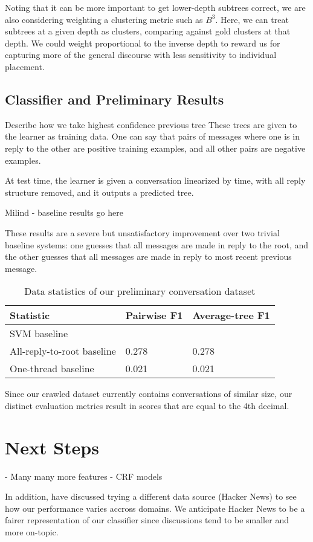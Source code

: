 \documentclass[10pt]{article}
\begin{document}
Noting that it can be more important to get lower-depth subtrees correct, we
are also considering weighting a clustering metric such as $B^3$. Here, we can
treat subtrees at a given depth as clusters, comparing against gold clusters at
that depth. We could weight proportional to the inverse depth to reward us for
capturing more of the general discourse with less sensitivity to individual placement.

\subsection{Classifier and Preliminary Results}
\label{sec:classifier}
{Describe how we take highest confidence previous tree}
These trees are given to the learner as training data. One can say that
pairs of messages where one is in reply to the other are positive training
examples, and all other pairs are negative examples.

At test time, the learner is given a conversation linearized by time, with all
reply structure removed, and it outputs a predicted tree.

{Milind - baseline results go here}

These results are a severe but unsatisfactory improvement over two trivial baseline
systems: one guesses that all messages are made in reply to the root, and the
other guesses that all messages are made in reply to most recent previous message.

\begin{table}[h]\footnotesize
 \begin{tabular}{| l | l | l |} 
   \hline
   \textbf{Statistic} & Pairwise F1 & Average-tree F1 \\
   \hline
    SVM baseline &  & \\
    All-reply-to-root baseline & 0.278 & 0.278 \\
    One-thread baseline & 0.021 & 0.021 \\
   \hline
  \end{tabular}
  \caption{Data statistics of our preliminary conversation dataset}
  \label{table:stats}
\end{table}

Since our crawled dataset currently contains conversations of similar size, our
distinct evaluation metrics result in scores that are equal to the 4th decimal.

\section{Next Steps}
- Many many more features
- CRF models~\cite{Wang2011a}

In addition, have discussed trying a different data source (Hacker News) to
see how our performance varies accross domains. We anticipate Hacker News
to be a fairer representation of our classifier since discussions tend to be 
smaller and more on-topic.

{} 

\end{document}
